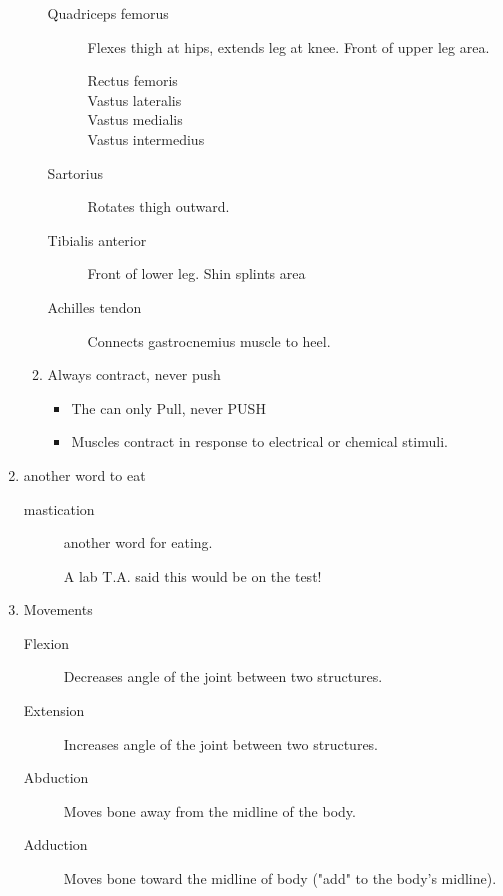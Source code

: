 \documentclass[11pt]{article}
\begin{document}
\begin{enumerate}
\begin{enumerate}
\begin{description}
\item[{Quadriceps femorus}] Flexes thigh at hips, extends leg at knee. Front of
upper leg area.
\begin{description}
\item[{Rectus femoris}] 

\item[{Vastus lateralis}] 

\item[{Vastus medialis}] 

\item[{Vastus intermedius}] 
\end{description}
\item[{Sartorius}] Rotates thigh outward.
\item[{Tibialis anterior}] Front of lower leg. Shin splints area
\item[{Achilles tendon}] Connects gastrocnemius muscle to heel.
\end{description}

\item Always contract, never push
\label{sec:org63f90cc}
\begin{itemize}
\item The can only Pull, never PUSH
\item Muscles contract in response to electrical or chemical stimuli.
\end{itemize}
\end{enumerate}

\item another word to eat
\label{sec:org2087c71}
\begin{description}
\item[{mastication}] another word for eating.

A lab T.A. said this would be on the test!
\end{description}

\item Movements
\label{sec:orgd53ad1d}
\begin{description}
\item[{Flexion}] Decreases angle of the joint between two structures.

\item[{Extension}] Increases angle of the joint between two structures.

\item[{Abduction}] Moves bone away from the midline of the body.

\item[{Adduction}] Moves bone toward the midline of body ("add" to the body's
midline).


\end{description}
\end{enumerate}
\end{document}
